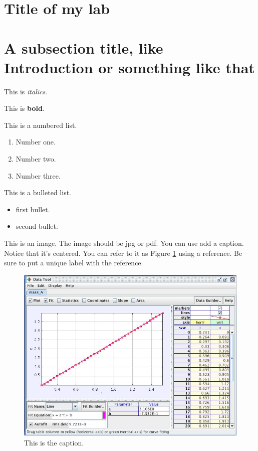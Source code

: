\documentclass[10pt]{article}
\begin{document}
\section*{Title of my lab}

\section*{A subsection title, like Introduction or something like that}

This is \emph{italics}.


This is {\bf bold}.


This is a numbered list.

\begin{enumerate}
	\item Number one.
	\item Number two.
	\item Number three.
\end{enumerate}

This is a bulleted list.

\begin{itemize}
	\item first bullet.
	\item second bullet.
\end{itemize}

This is an image. The image should be jpg or pdf. You can use add a caption. Notice that it's centered. You can refer to it as Figure \ref{uniqueLabel} using a reference. Be sure to put a unique label with the reference.

\begin{figure}[htbp]
\begin{center}
\includegraphics[scale=0.3]{imagename}
\caption{This is the caption.}
\label{uniqueLabel}
\end{center}
\end{figure}
\end{document}
